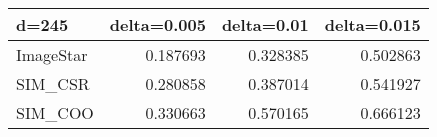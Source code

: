 \begin{tabular}{lrrr}
\hline
 d=245     &   delta=0.005 &   delta=0.01 &   delta=0.015 \\
\hline
 ImageStar &      0.187693 &     0.328385 &      0.502863 \\
 SIM\_CSR   &      0.280858 &     0.387014 &      0.541927 \\
 SIM\_COO   &      0.330663 &     0.570165 &      0.666123 \\
\hline
\end{tabular}
